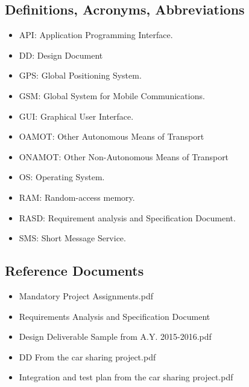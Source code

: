 \documentclass[a4paper,leqno]{article}
\begin{document}
\subsection{Definitions, Acronyms, Abbreviations}
\begin{itemize}
	\item API: Application Programming Interface.
	\item DD: Design Document
	\item GPS: Global Positioning System.
	\item GSM: Global System for Mobile Communications.
	\item GUI: Graphical User Interface.
	\item OAMOT: Other Autonomous Means of Transport
	\item ONAMOT: Other Non-Autonomous Means of Transport
	\item OS: Operating System.
	\item RAM: Random-access memory.
	\item RASD: Requirement analysis and Specification Document.
	\item SMS: Short Message Service.
\end{itemize}


\subsection{Reference Documents}
\begin{itemize}
	\item Mandatory Project Assignments.pdf
	\item Requirements Analysis and Specification Document
	\item Design Deliverable Sample from A.Y. 2015-2016.pdf
	\item DD From the car sharing project.pdf
	\item Integration and test plan from the car sharing project.pdf
\end{itemize}
\end{document}
